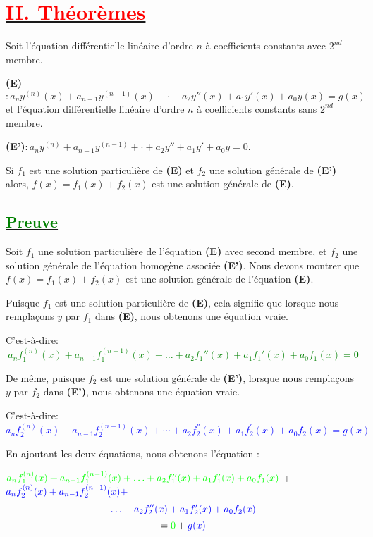 \documentclass{article}
\begin{document}
\section*{\underline{\textbf{\textcolor{red}{II. Théorèmes}}}}
Soit l'équation différentielle linéaire d'ordre $n$ à coefficients constants avec $2^{nd}$ membre.
 
\textbf{(E)}$:a_{n}y^{(n)}(x)+a_{n-1}y^{(n-1)}(x)+\cdot+a_{2}y''(x)+a_{1}y'(x)+a_{0}y(x)=g(x)$ et l'équation différentielle linéaire d'ordre $n$ à coefficients constants sans $2^{nd}$ membre.

\textbf{(E')}$:a_{n}y^{(n)}+a_{n-1}y^{(n-1)}+\cdot+a_{2}y''+a_{1}y'+a_{0}y=0$.

Si $f_{1}$ est une solution particulière de \textbf{(E)} et $f_{2}$ une solution générale de \textbf{(E')} alors, $f(x)=f_{1}(x)+f_{2}(x)$ est une solution générale de \textbf{(E)}.

\subsection*{\underline{\textbf{\textcolor{green}{Preuve}}}}
Soit $f_1$ une solution particulière de l'équation \textbf{(E)} avec second membre, et $f_2$ une solution générale de l'équation homogène associée \textbf{(E')}. Nous devons montrer que $f(x) = f_1(x) + f_2(x)$ est une solution générale de l'équation \textbf{(E)}.

Puisque $f_1$ est une solution particulière de \textbf{(E)}, cela signifie que lorsque nous remplaçons $y$ par $f_1$ dans \textbf{(E)}, nous obtenons une équation vraie. 

C'est-à-dire: \textcolor{green}{\[a_{n}f_1^{(n)}(x) + a_{n-1}f_1^{(n-1)}(x) + \ldots + a_{2}f_{1}''(x) + a_{1}f_{1}'(x) + a_{0}f_{1}(x)=0\]}

De même, puisque $f_2$ est une solution générale de \textbf{(E')}, lorsque nous remplaçons $y$ par $f_2$ dans \textbf{(E')}, nous obtenons une équation vraie.

C'est-à-dire: \textcolor{blue}{\[a_{n}f_{2}^{(n)}(x)+a_{n-1}f_{2}^{(n-1)}(x)+\cdots+a_{2}f_{2}^{''}(x)+a_{1}f_{2}^{'}(x)+a_{0}f_{2}(x)=g(x)\]}

En ajoutant les deux équations, nous obtenons l'équation :

$\textcolor{green}{a_{n}f_1^{(n)}(x) + a_{n-1}f_1^{(n-1)}(x) + \ldots + a_{2}f_{1}''(x) + a_{1}f_{1}'(x) + a_{0}f_{1}(x)}$ + $\textcolor{blue}{a_{n}f_2^{(n)}(x) + a_{n-1}f_2^{(n-1)}(x) +}$ 
\[\textcolor{blue}{\ldots + a_{2}f_{2}''(x) + a_{1}f_{2}'(x) + a_{0}f_{2}(x)}\]
\[=\textcolor{green}{0}+\textcolor{blue}{g(x)}\]
\end{document}
